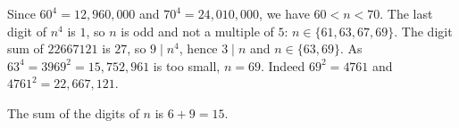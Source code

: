 Since $60^4=12{,}960{,}000$ and $70^4=24{,}010{,}000$, we have $60<n<70$. The last digit of $n^4$ is $1$, so $n$ is odd and not a multiple of $5$: $n\in\{61,63,67,69\}$. The digit sum of $22667121$ is $27$, so $9\mid n^4$, hence $3\mid n$ and $n\in\{63,69\}$. As $63^4=3969^2=15{,}752{,}961$ is too small, $n=69$. Indeed $69^2=4761$ and $4761^2=22{,}667{,}121$.

The sum of the digits of $n$ is $6+9=\boxed{15}$.
